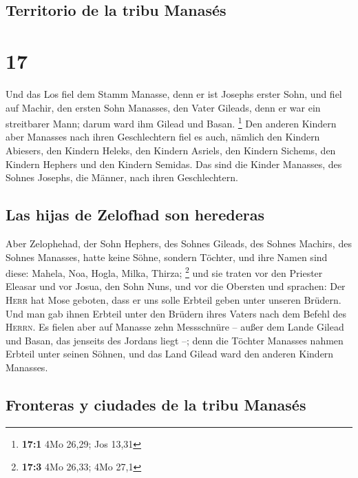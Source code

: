 \hypertarget{territorio-de-la-tribu-manasuxe9s}{%
\subsection{Territorio de la tribu
Manasés}\label{territorio-de-la-tribu-manasuxe9s}}

\hypertarget{section-16}{%
\section{17}\label{section-16}}

 Und das Los fiel dem Stamm Manasse, denn er ist Josephs
erster Sohn, und fiel auf Machir, den ersten Sohn Manasses, den Vater
Gileads, denn er war ein streitbarer Mann; darum ward ihm Gilead und
Basan. \footnote{\textbf{17:1} 4Mo 26,29; Jos 13,31}  Den
anderen Kindern aber Manasses nach ihren Geschlechtern fiel es auch,
nämlich den Kindern Abiesers, den Kindern Heleks, den Kindern Asriels,
den Kindern Sichems, den Kindern Hephers und den Kindern Semidas. Das
sind die Kinder Manasses, des Sohnes Josephs, die Männer, nach ihren
Geschlechtern.

\hypertarget{las-hijas-de-zelofhad-son-herederas}{%
\subsection{Las hijas de Zelofhad son
herederas}\label{las-hijas-de-zelofhad-son-herederas}}

 Aber Zelophehad, der Sohn Hephers, des Sohnes Gileads,
des Sohnes Machirs, des Sohnes Manasses, hatte keine Söhne, sondern
Töchter, und ihre Namen sind diese: Mahela, Noa, Hogla, Milka, Thirza;
\footnote{\textbf{17:3} 4Mo 26,33; 4Mo 27,1}  und sie
traten vor den Priester Eleasar und vor Josua, den Sohn Nuns, und vor
die Obersten und sprachen: Der \textsc{Herr} hat Mose geboten, dass er
uns solle Erbteil geben unter unseren Brüdern. Und man gab ihnen Erbteil
unter den Brüdern ihres Vaters nach dem Befehl des \textsc{Herrn}.
 Es fielen aber auf Manasse zehn Messschnüre -- außer dem
Lande Gilead und Basan, das jenseits des Jordans liegt --;
 denn die Töchter Manasses nahmen Erbteil unter seinen
Söhnen, und das Land Gilead ward den anderen Kindern Manasses.

\hypertarget{fronteras-y-ciudades-de-la-tribu-manasuxe9s}{%
\subsection{Fronteras y ciudades de la tribu
Manasés}\label{fronteras-y-ciudades-de-la-tribu-manasuxe9s}}

